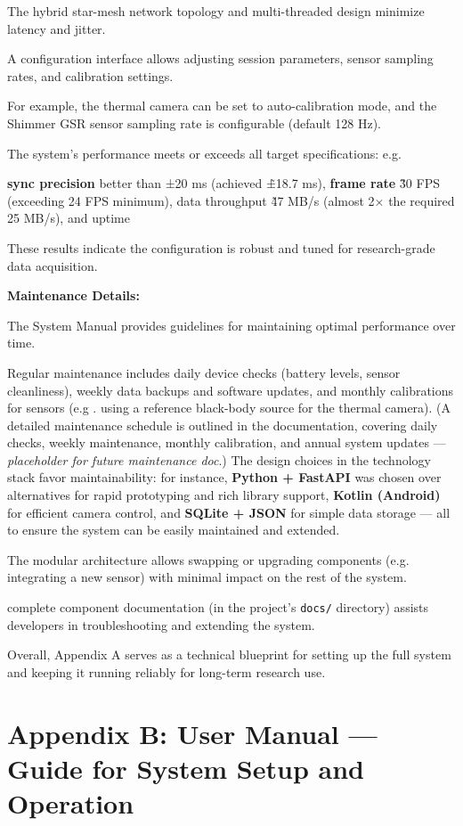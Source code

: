 The hybrid star-mesh network topology and multi-threaded design minimize latency
and jitter.

A configuration interface allows adjusting session parameters, sensor sampling
rates, and calibration settings.

For example, the thermal camera can be set to auto-calibration mode, and the
Shimmer GSR sensor sampling rate is configurable (default 128 Hz).

The system's performance meets or exceeds all target specifications: e.g.

\textbf{sync precision}
 better than ±20 ms (achieved \~±18.7 ms), \textbf{frame rate}
\~30 FPS (exceeding 24 FPS minimum), data throughput \~47 MB/s (almost 2× the
required 25 MB/s), and uptime %

These results indicate the configuration is robust and tuned for research-grade
data acquisition.

\textbf{Maintenance Details:}

The System Manual provides guidelines for maintaining optimal performance over
time.

Regular maintenance includes daily device checks (battery levels, sensor cleanliness), weekly data backups and software updates, and monthly calibrations for sensors (e.g
. using a reference black-body source for the thermal camera).
(A detailed maintenance schedule is outlined in the documentation, covering daily checks, weekly maintenance, monthly calibration, and annual system updates --- \textit{placeholder for future maintenance doc}.) The design choices in the technology stack favor maintainability: for instance, \textbf{Python + FastAPI}
was chosen over alternatives for rapid prototyping and rich library support, \textbf{Kotlin (Android)}
 for efficient camera control, and \textbf{SQLite + JSON}
for simple data storage --- all to ensure the system can be easily maintained
and extended.

The modular architecture allows swapping or upgrading components (e.g.
integrating a new sensor) with minimal impact on the rest of the system.

complete component documentation (in the project's \texttt{docs/} directory)
assists developers in troubleshooting and extending the system.

Overall, Appendix A serves as a technical blueprint for setting up the full
system and keeping it running reliably for long-term research use.

\section{Appendix B: User Manual --- Guide for System Setup and Operation}

